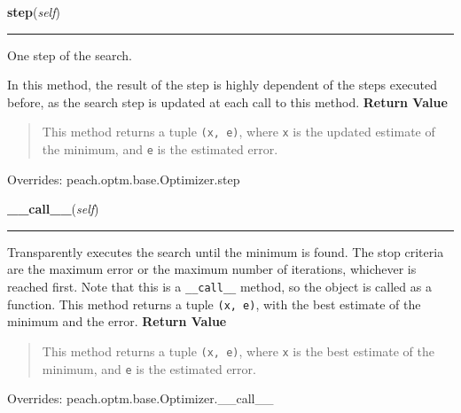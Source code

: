 \hspace{.8\funcindent}\begin{boxedminipage}{\funcwidth}

    \raggedright \textbf{step}(\textit{self})

    \vspace{-1.5ex}

    \rule{\textwidth}{0.5\fboxrule}
\setlength{\parskip}{2ex}

One step of the search.

In this method, the result of the step is highly dependent of the steps
executed before, as the search step is updated at each call to this
method.
\setlength{\parskip}{1ex}
      \textbf{Return Value}
    \vspace{-1ex}

      \begin{quote}

This method returns a tuple \texttt{(x, e)}, where \texttt{x} is the updated
estimate of the minimum, and \texttt{e} is the estimated error.
      \end{quote}

      Overrides: peach.optm.base.Optimizer.step

    \end{boxedminipage}

    \vspace{0.5ex}

\hspace{.8\funcindent}\begin{boxedminipage}{\funcwidth}

    \raggedright \textbf{\_\_call\_\_}(\textit{self})

    \vspace{-1.5ex}

    \rule{\textwidth}{0.5\fboxrule}
\setlength{\parskip}{2ex}

Transparently executes the search until the minimum is found. The stop
criteria are the maximum error or the maximum number of iterations,
whichever is reached first. Note that this is a \texttt{\_\_call\_\_} method, so
the object is called as a function. This method returns a tuple
\texttt{(x, e)}, with the best estimate of the minimum and the error.
\setlength{\parskip}{1ex}
      \textbf{Return Value}
    \vspace{-1ex}

      \begin{quote}

This method returns a tuple \texttt{(x, e)}, where \texttt{x} is the best
estimate of the minimum, and \texttt{e} is the estimated error.
      \end{quote}

      Overrides: peach.optm.base.Optimizer.\_\_call\_\_

    \end{boxedminipage}


